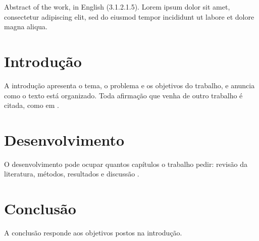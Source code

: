 \documentclass[dsc]{ufrj}
\begin{document}
  \frontmatter

  \begin{abstract}
  Resumo do trabalho, de 150 a 500 palavras, num só parágrafo (3.1.2.1.4).
  Lorem ipsum dolor sit amet, consectetur adipiscing elit, sed do eiusmod
  tempor incididunt ut labore et dolore magna aliqua.
  \end{abstract}

  \begin{foreignabstract}
  Abstract of the work, in English (3.1.2.1.5). Lorem ipsum dolor sit amet,
  consectetur adipiscing elit, sed do eiusmod tempor incididunt ut labore et
  dolore magna aliqua.
  \end{foreignabstract}

  \tableofcontents

  \mainmatter

  \chapter{Introdução}

  A introdução apresenta o tema, o problema e os objetivos do trabalho, e
  anuncia como o texto está organizado. Toda afirmação que venha de outro
  trabalho é citada, como em \citet{book-example}.

  \chapter{Desenvolvimento}

  O desenvolvimento pode ocupar quantos capítulos o trabalho pedir: revisão
  da literatura, métodos, resultados e discussão \citep{article-example}.

  \chapter{Conclusão}

  A conclusão responde aos objetivos postos na introdução.

  \backmatter

  \printbibliography
\end{document}
